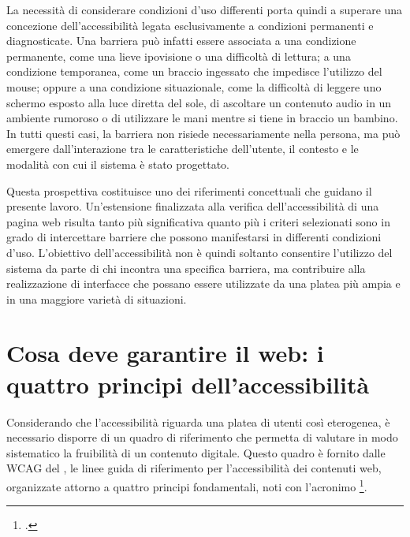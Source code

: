 La necessità di considerare condizioni d'uso differenti porta quindi a superare una concezione dell'accessibilità legata esclusivamente a condizioni permanenti e diagnosticate. Una barriera può infatti essere associata a una condizione permanente, come una lieve ipovisione o una difficoltà di lettura; a una condizione temporanea, come un braccio ingessato che impedisce l'utilizzo del mouse; oppure a una condizione situazionale, come la difficoltà di leggere uno schermo esposto alla luce diretta del sole, di ascoltare un contenuto audio in un ambiente rumoroso o di utilizzare le mani mentre si tiene in braccio un bambino. In tutti questi casi, la barriera non risiede necessariamente nella persona, ma può emergere dall'interazione tra le caratteristiche dell'utente, il contesto e le modalità con cui il sistema è stato progettato.

Questa prospettiva costituisce uno dei riferimenti concettuali che guidano il presente lavoro. Un'estensione finalizzata alla verifica dell'accessibilità di una pagina web risulta tanto più significativa quanto più i criteri selezionati sono in grado di intercettare barriere che possono manifestarsi in differenti condizioni d'uso. L'obiettivo dell'accessibilità non è quindi soltanto consentire l'utilizzo del sistema da parte di chi incontra una specifica barriera, ma contribuire alla realizzazione di interfacce che possano essere utilizzate da una platea più ampia e in una maggiore varietà di situazioni.

\section{Cosa deve garantire il web: i quattro principi dell'accessibilità}

\label{sec:quattro-principi}

Considerando che l'accessibilità riguarda una platea di utenti così eterogenea, è necessario disporre di un quadro di riferimento che permetta di valutare in modo sistematico la fruibilità di un contenuto digitale. Questo quadro è fornito dalle WCAG del , le linee guida di riferimento per l'accessibilità dei contenuti web, organizzate attorno a quattro principi fondamentali, noti con l'acronimo \footcite[§ \enquote{Understanding the Four Principles of Accessibility}]{w3c:understanding-intro}.

